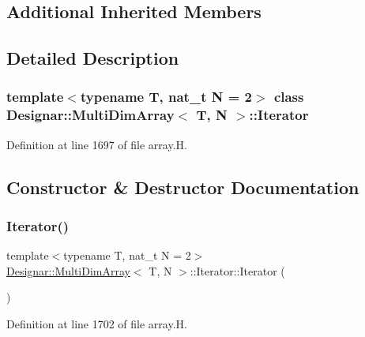 \subsection*{Additional Inherited Members}


\subsection{Detailed Description}
\subsubsection*{template$<$typename T, nat\+\_\+t N = 2$>$\newline
class Designar\+::\+Multi\+Dim\+Array$<$ T, N $>$\+::\+Iterator}



Definition at line 1697 of file array.\+H.



\subsection{Constructor \& Destructor Documentation}
\mbox{\label{class_designar_1_1_multi_dim_array_1_1_iterator_af627beb86cf5b1154f421078082b18f9}} 
\subsubsection{\texorpdfstring{Iterator()}{Iterator()}\hspace{0.1cm}{\footnotesize\ttfamily [1/5]}}
{\footnotesize\ttfamily template$<$typename T, nat\+\_\+t N = 2$>$ \\
\hyperlink{class_designar_1_1_multi_dim_array}{Designar\+::\+Multi\+Dim\+Array}$<$ T, N $>$\+::Iterator\+::\+Iterator (\begin{DoxyParamCaption}{ }\end{DoxyParamCaption})\hspace{0.3cm}{\ttfamily [inline]}}



Definition at line 1702 of file array.\+H.

\mbox{\label{class_designar_1_1_multi_dim_array_1_1_iterator_a0b4865a27a5f64866d63376f24076b9f}} 
